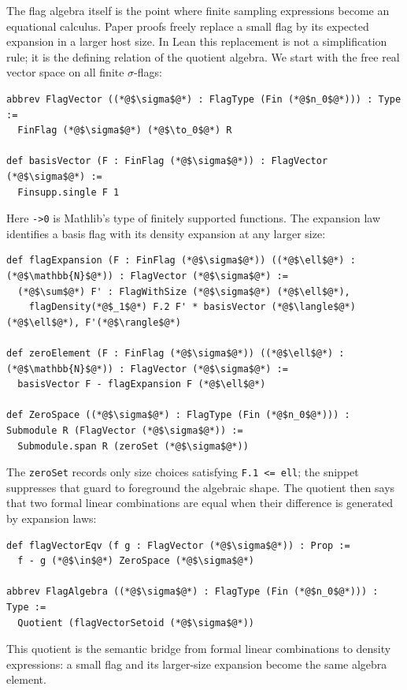 \documentclass{article}
\newcommand{\lean}[1]{\texttt{#1}}
\begin{document}
The flag algebra itself is the point where finite sampling expressions become
an equational calculus.  Paper proofs freely replace a small flag by its
expected expansion in a larger host size.  In Lean this replacement is not a
simplification rule; it is the defining relation of the quotient algebra.  We
start with the free real vector space on all finite $\sigma$-flags:
\begin{lstlisting}
abbrev FlagVector ((*@$\sigma$@*) : FlagType (Fin (*@$n_0$@*))) : Type :=
  FinFlag (*@$\sigma$@*) (*@$\to_0$@*) R

def basisVector (F : FinFlag (*@$\sigma$@*)) : FlagVector (*@$\sigma$@*) :=
  Finsupp.single F 1
\end{lstlisting}
Here \lean{->0} is Mathlib's type of finitely supported functions.  The
expansion law identifies a basis flag with its density expansion at any larger
size:
\begin{lstlisting}
def flagExpansion (F : FinFlag (*@$\sigma$@*)) ((*@$\ell$@*) : (*@$\mathbb{N}$@*)) : FlagVector (*@$\sigma$@*) :=
  (*@$\sum$@*) F' : FlagWithSize (*@$\sigma$@*) (*@$\ell$@*),
    flagDensity(*@$_1$@*) F.2 F' * basisVector (*@$\langle$@*)(*@$\ell$@*), F'(*@$\rangle$@*)

def zeroElement (F : FinFlag (*@$\sigma$@*)) ((*@$\ell$@*) : (*@$\mathbb{N}$@*)) : FlagVector (*@$\sigma$@*) :=
  basisVector F - flagExpansion F (*@$\ell$@*)

def ZeroSpace ((*@$\sigma$@*) : FlagType (Fin (*@$n_0$@*))) : Submodule R (FlagVector (*@$\sigma$@*)) :=
  Submodule.span R (zeroSet (*@$\sigma$@*))
\end{lstlisting}
The \lean{zeroSet} records only size choices satisfying \lean{F.1 <= ell}; the
snippet suppresses that guard to foreground the algebraic shape.  The quotient
then says that two formal linear combinations are equal when their difference
is generated by expansion laws:
\begin{lstlisting}
def flagVectorEqv (f g : FlagVector (*@$\sigma$@*)) : Prop :=
  f - g (*@$\in$@*) ZeroSpace (*@$\sigma$@*)

abbrev FlagAlgebra ((*@$\sigma$@*) : FlagType (Fin (*@$n_0$@*))) : Type :=
  Quotient (flagVectorSetoid (*@$\sigma$@*))
\end{lstlisting}
This quotient is the semantic bridge from formal linear combinations to
density expressions: a small flag and its larger-size expansion become the
same algebra element.
\end{document}
